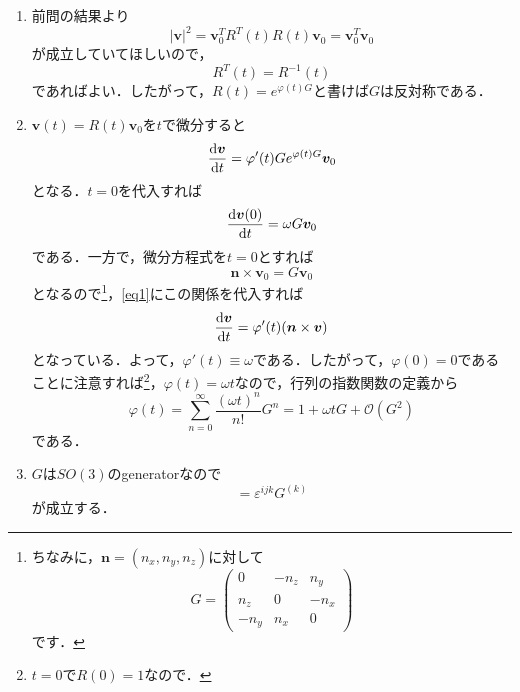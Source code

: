 \documentclass[a4paper,pdflatex,ja=standard]{bxjsarticle}
\begin{document}
\begin{enumerate}
  \item 
  前問の結果より
  \begin{equation}
    |\bm{v}|^{2}
    =
    \bm{v}_{0}^{T}R^{T}(t)
    R(t)\bm{v}_{0}
    =
    \bm{v}_{0}^{T}
    \bm{v}_{0}
  \end{equation}
  が成立していてほしいので，
  \begin{equation}
    R^{T}(t)
    =
    R^{-1}(t)
  \end{equation}
  であればよい．したがって，$R(t)=e^{\varphi(t)G}$と書けば$G$は反対称である．

  \item
  $\bm{v}(t)=R(t)\bm{v}_{0}$を$t$で微分すると
  \begin{equation}
    \dv{\bm{v}}{t}
    =
    \varphi'(t)
    G
    e^{\varphi(t)G}\bm{v}_0
    \label{eq1}
  \end{equation}
  となる．$t=0$を代入すれば
  \begin{equation}
    \dv{\bm{v}(0)}{t}
    =
    \omega G\bm{v}_0
  \end{equation}
  である．一方で，微分方程式を$t=0$とすれば
  \begin{equation}
    \bm{n}\times\bm{v}_0
    =
    G\bm{v}_0
  \end{equation}
  となるので\footnote{
    ちなみに，$\bm{n}=(n_x,n_y,n_z)$に対して
    $$
      G
      =
      \begin{pmatrix}
        0 & -n_z & n_y \\
        n_z & 0 & -n_x \\
        -n_y & n_x & 0
      \end{pmatrix}
    $$
    です．
  }，\eqref{eq1}にこの関係を代入すれば
  \begin{equation}
    \dv{\bm{v}}{t}
    =
    \varphi'(t)
    (\bm{n}\times\bm{v})
  \end{equation}
  となっている．よって，$\varphi'(t)\equiv\omega$である．したがって，$\varphi(0)=0$であることに注意すれば\footnote{
    $t=0$で$R(0)=1$なので．
  }，$\varphi(t)=\omega t$なので，行列の指数関数の定義から
  \begin{equation}
    \varphi(t)
    =
    \sum_{n=0}^{\infty}\frac{(\omega t)^n}{n!}G^{n}
    =
    1+\omega t G +\mathcal{O}(G^2)
  \end{equation}
  である．

  \item 
  $G$は$SO(3)$のgeneratorなので
  \begin{equation}
    [G^{(i)},G^{(j)}]
    =
    \varepsilon^{ijk}G^{(k)}
    \label{commu_rel}
  \end{equation}
  が成立する．

\end{enumerate}
\end{document}
